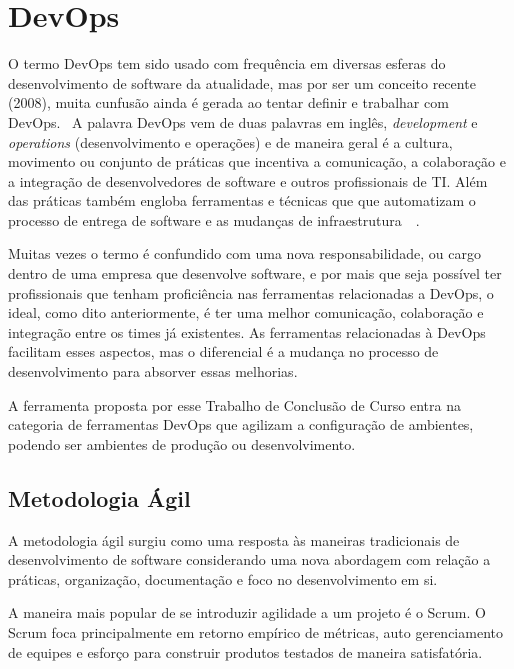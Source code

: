 \section{DevOps}
\label{sec:devops}

O termo DevOps tem sido usado com frequência em diversas esferas do
desenvolvimento de software da atualidade, mas por ser um conceito recente
(2008), muita cunfusão ainda é gerada ao tentar definir e trabalhar com DevOps.~\cite{adambertram:2016}
A palavra DevOps vem de duas palavras em inglês, \textit{development} e \textit{operations}
(desenvolvimento e operações) e de maneira geral é a cultura, movimento
ou conjunto de práticas que incentiva a comunicação, a colaboração e a integração de
desenvolvedores de software e outros profissionais de TI. Além das práticas 
também engloba ferramentas e técnicas que que automatizam o processo de entrega
de software e as mudanças de infraestrutura~\cite{loukides2012devops}~\cite{erich2014mapping}.

Muitas vezes o termo é confundido com uma nova responsabilidade, ou cargo
dentro de uma empresa que desenvolve software, e por mais que seja possível
ter profissionais que tenham proficiência nas ferramentas relacionadas a
DevOps, o ideal, como dito anteriormente, é ter uma melhor comunicação,
colaboração e integração entre os times já existentes. As ferramentas
relacionadas à DevOps facilitam esses aspectos, mas o diferencial é a
mudança no processo de desenvolvimento para absorver essas melhorias.~\cite{adambertram:2016}

A ferramenta proposta por esse Trabalho de Conclusão de Curso entra na categoria
de ferramentas DevOps que agilizam a configuração de ambientes, podendo ser ambientes
de produção ou desenvolvimento.


\subsection{Metodologia Ágil}

A metodologia ágil surgiu como uma resposta às maneiras tradicionais de desenvolvimento
de software considerando uma nova abordagem com relação a práticas, organização,
documentação e foco no desenvolvimento em si.~\cite{agilemetorg:2016}

A maneira mais popular de se introduzir agilidade a um projeto é o Scrum. O Scrum
foca principalmente em retorno empírico de métricas, auto gerenciamento de
equipes e esforço para construir produtos testados de maneira 
satisfatória.~\cite{agilemetorg:2016}

